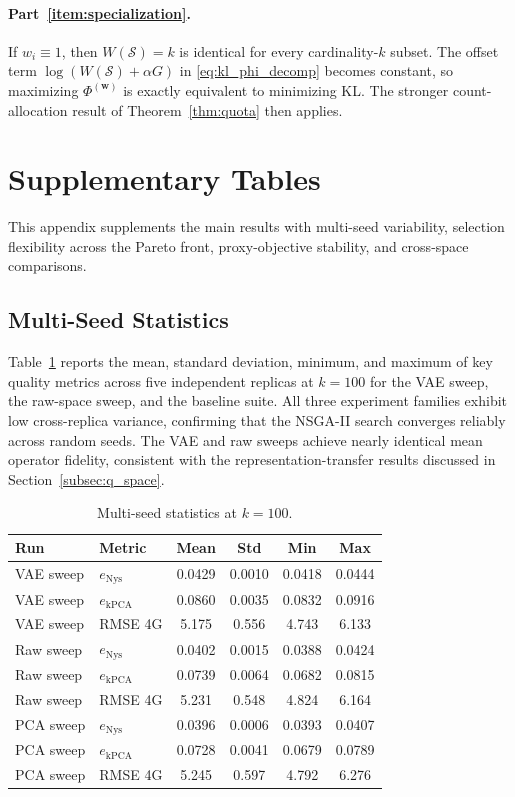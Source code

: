 \documentclass[10pt,journal]{IEEEtran}
\newcommand{\1}{\mathbf{1}}
\newcommand{\bw}{\mathbf{w}}
\newcommand{\Sel}{\mathcal{S}}
\theoremstyle{ieeethm}
\begin{document}
\paragraph{Part~\ref{item:specialization}.}
If $w_i\equiv 1$, then $W(\Sel)=k$ is identical for every cardinality-$k$ subset. The offset term $\log(W(\Sel)+\alpha G)$ in \eqref{eq:kl_phi_decomp} becomes constant, so maximizing $\Phi^{(\bw)}$ is exactly equivalent to minimizing KL. The stronger count-allocation result of Theorem~\ref{thm:quota} then applies.

\section{Supplementary Tables}
\label{app:supp_tables}

This appendix supplements the main results with multi-seed variability, selection flexibility across the Pareto front, proxy-objective stability, and cross-space comparisons.

\subsection{Multi-Seed Statistics}

Table~\ref{tab:multi-seed-stats} reports the mean, standard deviation, minimum, and maximum of key quality metrics across five independent replicas at $k{=}100$ for the VAE sweep, the raw-space sweep, and the baseline suite. All three experiment families exhibit low cross-replica variance, confirming that the NSGA-II search converges reliably across random seeds. The VAE and raw sweeps achieve nearly identical mean operator fidelity, consistent with the representation-transfer results discussed in Section~\ref{subsec:q_space}.

\begin{table}[h]
\centering
\caption{Multi-seed statistics at $k=100$.}
\label{tab:multi-seed-stats}
\small
\begin{tabular}{l l c c c c}
\toprule
Run & Metric & Mean & Std & Min & Max \\
\midrule
VAE sweep & $e_{\mathrm{Nys}}$ & 0.0429 & 0.0010 & 0.0418 & 0.0444 \\
VAE sweep & $e_{\mathrm{kPCA}}$ & 0.0860 & 0.0035 & 0.0832 & 0.0916 \\
VAE sweep & RMSE 4G & 5.175 & 0.556 & 4.743 & 6.133 \\
Raw sweep & $e_{\mathrm{Nys}}$ & 0.0402 & 0.0015 & 0.0388 & 0.0424 \\
Raw sweep & $e_{\mathrm{kPCA}}$ & 0.0739 & 0.0064 & 0.0682 & 0.0815 \\
Raw sweep & RMSE 4G & 5.231 & 0.548 & 4.824 & 6.164 \\
PCA sweep & $e_{\mathrm{Nys}}$ & 0.0396 & 0.0006 & 0.0393 & 0.0407 \\
PCA sweep & $e_{\mathrm{kPCA}}$ & 0.0728 & 0.0041 & 0.0679 & 0.0789 \\
PCA sweep & RMSE 4G & 5.245 & 0.597 & 4.792 & 6.276 \\
\bottomrule
\end{tabular}
\end{table}
\end{document}
